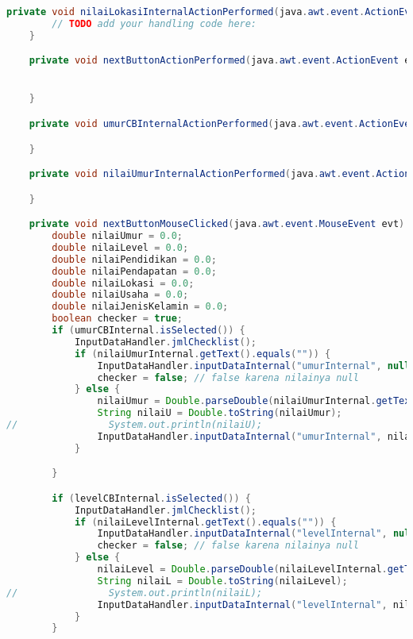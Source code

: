 \begin{lstlisting}[language=Java, caption=TampilanBobotKetetanggaan.java]
    private void nilaiLokasiInternalActionPerformed(java.awt.event.ActionEvent evt) {                                                    
        // TODO add your handling code here:
    }                                                   

    private void nextButtonActionPerformed(java.awt.event.ActionEvent evt) {                                           


    }                                          

    private void umurCBInternalActionPerformed(java.awt.event.ActionEvent evt) {                                               

    }                                              

    private void nilaiUmurInternalActionPerformed(java.awt.event.ActionEvent evt) {                                                  

    }                                                 

    private void nextButtonMouseClicked(java.awt.event.MouseEvent evt) {                                        
        double nilaiUmur = 0.0;
        double nilaiLevel = 0.0;
        double nilaiPendidikan = 0.0;
        double nilaiPendapatan = 0.0;
        double nilaiLokasi = 0.0;
        double nilaiUsaha = 0.0;
        double nilaiJenisKelamin = 0.0;
        boolean checker = true;
        if (umurCBInternal.isSelected()) {
            InputDataHandler.jmlChecklist();
            if (nilaiUmurInternal.getText().equals("")) {
                InputDataHandler.inputDataInternal("umurInternal", null);
                checker = false; // false karena nilainya null
            } else {
                nilaiUmur = Double.parseDouble(nilaiUmurInternal.getText()) / 100.0;
                String nilaiU = Double.toString(nilaiUmur);
//                System.out.println(nilaiU);
                InputDataHandler.inputDataInternal("umurInternal", nilaiU);
            }

        }

        if (levelCBInternal.isSelected()) {
            InputDataHandler.jmlChecklist();
            if (nilaiLevelInternal.getText().equals("")) {
                InputDataHandler.inputDataInternal("levelInternal", null);
                checker = false; // false karena nilainya null
            } else {
                nilaiLevel = Double.parseDouble(nilaiLevelInternal.getText()) / 100.0;
                String nilaiL = Double.toString(nilaiLevel);
//                System.out.println(nilaiL);
                InputDataHandler.inputDataInternal("levelInternal", nilaiL);
            }
        }


\end{lstlisting}

